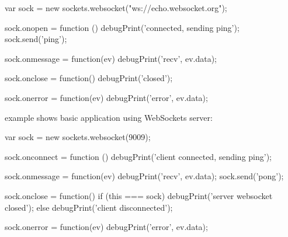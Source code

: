 \begin{listingverbatim}
var sock = new sockets.websocket("ws://echo.websocket.org");

sock.onopen = function () {
    debugPrint('connected, sending ping');
    sock.send('ping');
}

sock.onmessage = function(ev) {
    debugPrint('recv', ev.data);
}

sock.onclose = function() {
    debugPrint('closed');
}

sock.onerror = function(ev) {
    debugPrint('error', ev.data);
}
\end{listingverbatim}

 example shows basic application using WebSockets server:

\begin{listingverbatim}
var sock = new sockets.websocket(9009);

sock.onconnect = function () {
    debugPrint('client connected, sending ping');
}

sock.onmessage = function(ev) {
    debugPrint('recv', ev.data);
    sock.send('pong');
}

sock.onclose = function() {
    if (this === sock) {
        debugPrint('server websocket closed');
    } else {
        debugPrint('client disconnected');
    }
}

sock.onerror = function(ev) {
    debugPrint('error', ev.data);
}
\end{listingverbatim}

